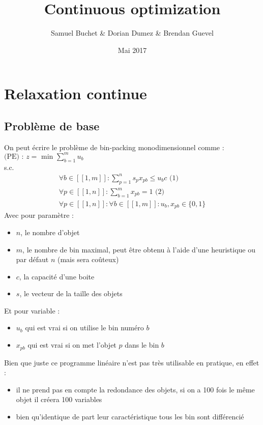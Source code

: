 \documentclass{article}
\title{Continuous optimization}
\author{Samuel Buchet \& Dorian Dumez \& Brendan Guevel}
\date{Mai 2017}
\begin{document}
\maketitle

\section{Relaxation continue}


\subsection{Problème de base}

On peut écrire le problème de bin-packing monodimensionnel comme :\\
$\text{(PE) : } z = \text{ min } \sum \limits_{b = 1 }^{m} u_b$\\
s.c.
\begin{align*}
 \forall b \in [\![ 1 , m ]\!] : \sum \limits_{p = 1}^{n} s_p x_{pb} \leqslant u_b c \text{ (1)}\\
 \forall p \in [\![ 1 , n ]\!] : \sum \limits_{b = 1}^{m} x_{pb} = 1 \text{ (2)}\\
 \forall p \in [\![ 1 , n ]\!] : \forall b \in [\![ 1 , m ]\!] : u_b , x_{pb} \in \{0,1\}
\end{align*}
Avec pour paramètre :
\begin{itemize}
\item
$n$, le nombre d'objet
\item
$m$, le nombre de bin maximal, peut être obtenu à l'aide d'une heuristique ou par défaut $n$ (mais sera coûteux)
\item
$c$, la capacité d'une boite
\item
$s$, le vecteur de la taille des objets
\end{itemize}
Et pour variable :
\begin{itemize}
\item
$u_b$ qui est vrai si on utilise le bin numéro $b$
\item
$x_{pb}$ qui est vrai si on met l'objet $p$ dans le bin $b$
\end{itemize}
Bien que juste ce programme linéaire n'est pas très utilisable en pratique, en effet :
\begin{itemize}
\item
il ne prend pas en compte la redondance des objets, si on a 100 fois le même objet il créera 100 variables
\item
bien qu'identique de part leur caractéristique tous les bin sont différencié
\end{itemize}
\end{document}
